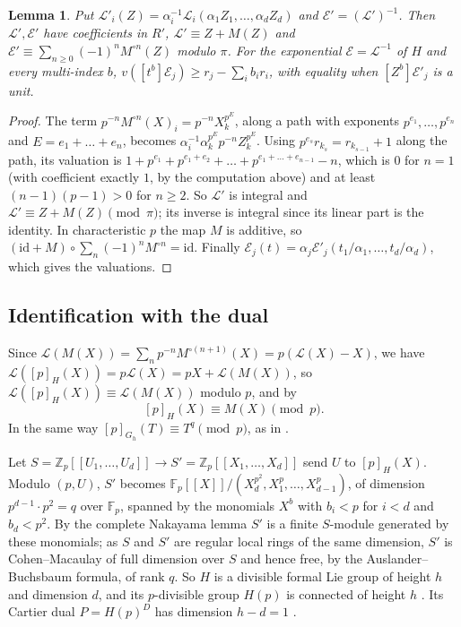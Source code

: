 \documentclass[11pt]{amsart}
\newtheorem{lemma}[thm]{Lemma}
\theoremstyle{definition}
\theoremstyle{remark}
\newcommand{\Z}{\mathbb Z}
\newcommand{\F}{\mathbb F}
\begin{document}
\begin{lemma}\label{lem:dualscale}
Put $\mathcal L'_i(Z)=\alpha_i^{-1}\mathcal L_i(\alpha_1Z_1,\dots,\alpha_dZ_d)$ and $\mathcal E'=(\mathcal L')^{-1}$. Then $\mathcal L',\mathcal E'$ have coefficients in $R'$, $\mathcal L'\equiv Z+M(Z)$ and $\mathcal E'\equiv\sum_{n\ge0}(-1)^nM^{\circ n}(Z)$ modulo $\pi$. For the exponential $\mathcal E=\mathcal L^{-1}$ of $H$ and every multi-index $b$, $v([t^b]\mathcal E_j)\ge r_j-\sum_ib_ir_i$, with equality when $[Z^b]\mathcal E'_j$ is a unit.
\end{lemma}

\begin{proof}
The term $p^{-n}M^{\circ n}(X)_i=p^{-n}X_k^{p^E}$, along a path with exponents $p^{e_1},\dots,p^{e_n}$ and $E=e_1+\dots+e_n$, becomes $\alpha_i^{-1}\alpha_k^{p^E}p^{-n}Z_k^{p^E}$. Using $p^{e_s}r_{k_s}=r_{k_{s-1}}+1$ along the path, its valuation is $1+p^{e_1}+p^{e_1+e_2}+\dots+p^{e_1+\dots+e_{n-1}}-n$, which is $0$ for $n=1$ (with coefficient exactly $1$, by the computation above) and at least $(n-1)(p-1)>0$ for $n\ge2$. So $\mathcal L'$ is integral and $\mathcal L'\equiv Z+M(Z)\pmod\pi$; its inverse is integral since its linear part is the identity. In characteristic $p$ the map $M$ is additive, so $(\mathrm{id}+M)\circ\sum_n(-1)^nM^{\circ n}=\mathrm{id}$. Finally $\mathcal E_j(t)=\alpha_j\mathcal E'_j(t_1/\alpha_1,\dots,t_d/\alpha_d)$, which gives the valuations.
\end{proof}

\subsection{Identification with the dual}
Since $\mathcal L(M(X))=\sum_np^{-n}M^{\circ(n+1)}(X)=p(\mathcal L(X)-X)$, we have $\mathcal L([p]_H(X))=p\mathcal L(X)=pX+\mathcal L(M(X))$, so $\mathcal L([p]_H(X))\equiv\mathcal L(M(X))$ modulo $p$, and by \cite[(2.8), p.~75]{Hazewinkel79}
\[
 [p]_H(X)\equiv M(X)\pmod p .
\]
In the same way $[p]_{G_h}(T)\equiv T^q\pmod p$, as in \cite[(5.4)]{Hazewinkel79}.

Let $S=\Z_p[[U_1,\dots,U_d]]\to S'=\Z_p[[X_1,\dots,X_d]]$ send $U$ to $[p]_H(X)$. Modulo $(p,U)$, $S'$ becomes $\F_p[[X]]/(X_d^{p^2},X_1^p,\dots,X_{d-1}^p)$, of dimension $p^{d-1}\cdot p^2=q$ over $\F_p$, spanned by the monomials $X^b$ with $b_i<p$ for $i<d$ and $b_d<p^2$. By the complete Nakayama lemma $S'$ is a finite $S$-module generated by these monomials; as $S$ and $S'$ are regular local rings of the same dimension, $S'$ is Cohen--Macaulay of full dimension over $S$ and hence free, by the Auslander--Buchsbaum formula, of rank $q$. So $H$ is a divisible formal Lie group of height $h$ and dimension $d$, and its $p$-divisible group $H(p)$ is connected of height $h$ \cite[\S2.2, Proposition 1]{Tate67}. Its Cartier dual $P=H(p)^D$ has dimension $h-d=1$ \cite[\S2.3, Proposition 3]{Tate67}.
\end{document}
